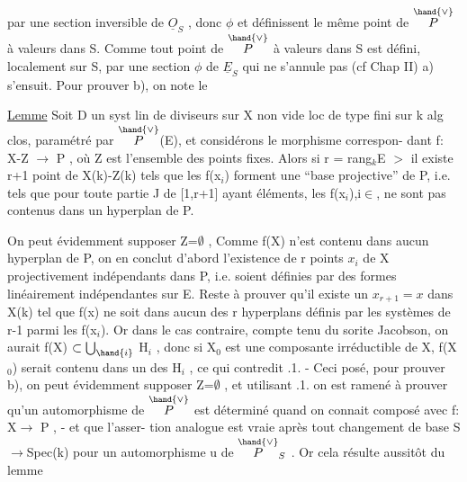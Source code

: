 
par une section inversible de $\underline{O}_S$ , donc $\phi$ et \unsure{$\psi$} définissent le même point
de $\overset{\hand{\vee}}{P}$ à valeurs dans S. Comme tout point de $\overset{\hand{\vee}}{P}$ à valeurs dans S est défini,
localement sur S, par une section $\phi$ de $\underline{E}_S$ qui ne s'annule pas (cf Chap II)
a) s'ensuit.   Pour prouver b), on note le

\uline{Lemme}   Soit D un syst lin de diviseurs sur X non vide loc de type fini
sur k alg clos, paramétré par $\overset{\hand{\vee}}{P}$(E), et considérons le morphisme correspon-%
dant  f: X-Z $\longrightarrow$ P , où Z est l'ensemble des points fixes. Alors  si
r = rang$_k$E $>$ il existe  r+1 point de  X(k)-Z(k)  tels que les
f(x$_i$) forment une  ``base projective'' de P, i.e. tels que  pour toute
partie J de [1,r+1] ayant   éléments,  les  f(x$_i$),i$\in$,  ne sont pas
contenus dans un hyperplan de P.

On peut évidemment supposer Z=$\emptyset$ ,   Comme  f(X) n'est contenu dans
aucun hyperplan de P, on en conclut d'abord l'existence de r points
$x_i$ de X  projectivement indépendants dans P, i.e. soient définies
par des formes linéairement indépendantes sur E.   Reste à prouver qu'il
existe un  $x_{r+1} = x$   dans X(k) tel que  f(x) ne soit dans aucun des r
hyperplans  définis par les  systèmes de r-1 parmi les f(x$_i$). Or dans
le cas contraire, compte tenu du sorite Jacobson,  on aurait
f(X) $\subset \bigcup_{\hand{i}}$ H$_i$ , donc  si X$_0$  est une composante
irréductible de X, f(X$_0$) serait contenu dans un des H$_i$ , ce qui contredit
.1. - Ceci posé,  pour prouver b), on peut  évidemment supposer Z=$\emptyset$ ,
et utilisant .1.  on est ramené à prouver qu'un automorphisme de $\overset{\hand{\vee}}{P}$ est
déterminé quand on connait  composé avec f: X$\longrightarrow$ P , - et que l'asser-%
tion analogue est vraie après tout changement de base S$\rightarrow$Spec(k)
pour un  automorphisme u de $\overset{\hand{\vee}}{P}_S$  .  Or cela résulte aussitôt  du lemme

